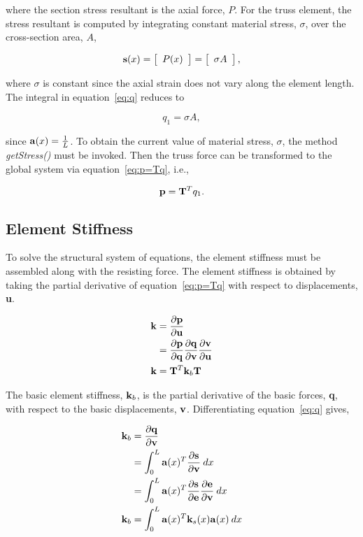 \documentclass[12pt]{article}
\begin{document}
\noindent where the section stress resultant is the axial force, $P$.
For the truss element, the stress resultant is computed by integrating
constant material stress, $\sigma$, over the cross-section area, $A$,

\begin{equation}
{\bf s}(x) =
\left[ \begin{array}{c} P(x) \end{array} \right] =
\left[ \begin{array}{c} \sigma A \end{array} \right],
\end{equation}

\noindent where $\sigma$ is constant since the axial strain does
not vary along the element length. The integral in equation~\ref{eq:q}
reduces to

\begin{equation}
q_1 = \sigma A,
\end{equation}

\noindent since ${\bf a}(x) = \frac{1}{L}$.
To obtain the current value of material stress, $\sigma$, the method
{\em getStress()} must be invoked. Then the truss force can be transformed
to the global system via equation~\ref{eq:p=Tq}, i.e.,

\begin{equation}
{\bf p} = {\bf T}^T q_1.
\end{equation}

\subsection{Element Stiffness}
To solve the structural system of equations, the element stiffness must be assembled
along with the resisting force. The element stiffness is obtained by taking the
partial derivative of equation~\ref{eq:p=Tq} with respect to displacements,
{\bf u}.

\begin{align}
{\bf k} &= \frac{\partial{\bf p}}{\partial{\bf u}}\\
&= \frac{\partial{\bf p}}{\partial{\bf q}} \frac{\partial{\bf q}}{\partial{\bf v}} \frac{\partial{\bf v}}{\partial{\bf u}} \\
{\bf k} &= \label{eq:k} {\bf T}^T {\bf k}_b {\bf T}
\end{align}

\noindent The basic element stiffness, ${\bf k}_b$, is the partial derivative
of the basic forces, {\bf q}, with respect to the basic displacements, ${\bf v}$.
Differentiating equation~\ref{eq:q} gives,

\begin{align}
{\bf k}_b &= \frac{\partial{\bf q}}{\partial{\bf v}} \\
&= \int_0^L {\bf a}(x)^T \frac{\partial{\bf s}}{\partial{\bf v}} \: dx \\
&= \int_0^L {\bf a}(x)^T \frac{\partial{\bf s}}{\partial{\bf e}} \frac{\partial{\bf e}}{\partial{\bf v}} \: dx \\
{\bf k}_b &= \int_0^L {\bf a}(x)^T {\bf k}_s(x) {\bf a}(x) \: dx \\
\end{align}
\end{document}
